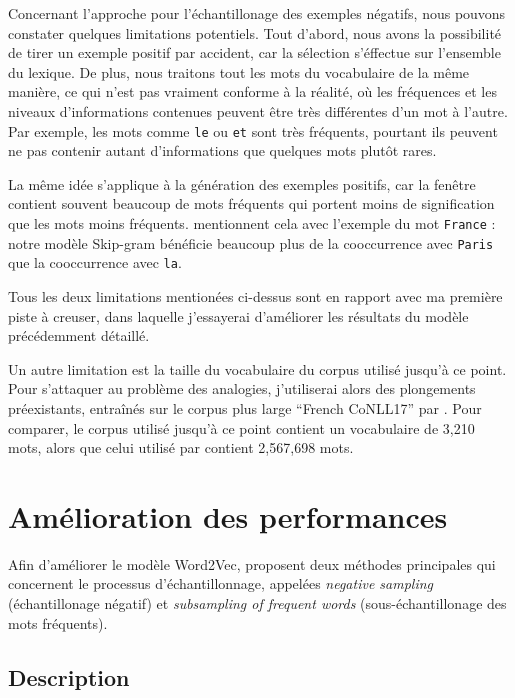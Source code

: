 \documentclass[12pt]{article}
\begin{document}
Concernant l'approche pour l'échantillonage des exemples négatifs, nous pouvons constater quelques limitations potentiels. Tout d'abord, nous avons la possibilité de tirer un exemple positif par accident, car la sélection s'éffectue sur l'ensemble du lexique. De plus, nous traitons tout les mots du vocabulaire de la même manière, ce qui n'est pas vraiment conforme à la réalité, où les fréquences et les niveaux d'informations contenues peuvent être très différentes d'un mot à l'autre. Par exemple, les mots comme \texttt{le} ou \texttt{et} sont très fréquents, pourtant ils peuvent ne pas contenir autant d'informations que quelques mots plutôt rares. 

La même idée s'applique à la génération des exemples positifs, car la fenêtre contient souvent beaucoup de mots fréquents qui portent moins de signification que les mots moins fréquents. \cite{DBLP:conf/nips/MikolovSCCD13} mentionnent cela avec l'exemple du mot \texttt{France} : notre modèle Skip-gram bénéficie beaucoup plus de la cooccurrence avec \texttt{Paris} que la cooccurrence avec \texttt{la}. 

Tous les deux limitations mentionées ci-dessus sont en rapport avec ma première piste à creuser, dans laquelle j'essayerai d'améliorer les résultats du modèle précédemment détaillé.  

Un autre limitation est la taille du vocabulaire du corpus utilisé jusqu'à ce point. Pour s'attaquer au problème des analogies, j'utiliserai alors des plongements préexistants, entraînés sur le corpus plus large ``French CoNLL17'' par \cite{fares-etal-2017-word}. Pour comparer, le corpus utilisé jusqu'à ce point contient un vocabulaire de 3,210 mots, alors que celui utilisé par \cite{fares-etal-2017-word} contient 2,567,698 mots.

\section{Amélioration des performances} \label{amélioration des performances}

Afin d'améliorer le modèle Word2Vec, \cite{DBLP:conf/nips/MikolovSCCD13} proposent deux méthodes principales qui concernent le processus d'échantillonnage, appelées \textit{negative sampling} (échantillonage négatif) et \textit{subsampling of frequent words} (sous-échantillonage des mots fréquents). 

\subsection{Description} \label{description-1}
\end{document}
